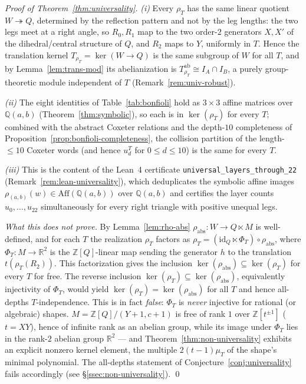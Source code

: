 \documentclass[11pt,a4paper]{article}
\theoremstyle{remark}
\theoremstyle{plain}
\begin{document}
\begin{proof}[Proof of Theorem~\ref{thm:universality}]
\emph{(i)}  Every $\rho_T$ has the same linear quotient
$W \twoheadrightarrow Q$, determined by the reflection pattern and not by
the leg lengths: the two legs meet at a right angle, so $R_0, R_1$ map to
the two order-$2$ generators $X, X'$ of the dihedral/central structure of
$Q$, and $R_2$ maps to $Y$, uniformly in $T$.  Hence the translation
kernel $T_{\rho_T} = \ker(W \to Q)$ is the same subgroup of $W$ for all
$T$, and by Lemma~\ref{lem:trans-mod} its abelianization is
$T_{\rho_T}^{\mathrm{ab}} \cong I_A \cap I_B$, a purely group-theoretic
module independent of $T$ (Remark~\ref{rem:univ-robust}).

\emph{(ii)}  The eight identities of Table~\ref{tab:bonfioli} hold as
$3 \times 3$ affine matrices over $\mathbb{Q}(a, b)$
(Theorem~\ref{thm:symbolic}), so each is in $\ker(\rho_T)$ for every $T$;
combined with the abstract Coxeter relations and the depth-$10$
completeness of Proposition~\ref{prop:bonfioli-completeness}, the
collision partition of the length-$\le 10$ Coxeter words (and hence
$u_d^T$ for $0 \le d \le 10$) is the same for every $T$.

\emph{(iii)}  This is the content of the Lean~4 certificate
\texttt{universal\_layers\_through\_22}
(Remark~\ref{rem:lean-universality}), which deduplicates the symbolic
affine images $\rho_{(a,b)}(w) \in \mathrm{Aff}(\mathbb{Q}(a,b))$ over
$\mathbb{Q}(a,b)$ and certifies the layer counts $u_0, \dots, u_{22}$
simultaneously for every right triangle with positive unequal legs.

\emph{What this does not prove.}  By Lemma~\ref{lem:rho-abs}
$\rho_{\mathrm{abs}} : W \to Q \ltimes M$ is well-defined, and for each
$T$ the realization $\rho_T$ factors as
$\rho_T = (\mathrm{id}_Q \ltimes \Phi_T) \circ \rho_{\mathrm{abs}}$,
where $\Phi_T : M \to \mathbb{R}^2$ is the $\mathbb{Z}[Q]$-linear map
sending the generator $h$ to the translation $t(\rho_T(R_2))$.  This
factorization gives the inclusion
$\ker(\rho_{\mathrm{abs}}) \subseteq \ker(\rho_T)$ for every $T$ for
free.  The reverse inclusion $\ker(\rho_T) \subseteq
\ker(\rho_{\mathrm{abs}})$, equivalently injectivity of $\Phi_T$,
would yield $\ker(\rho_T) = \ker(\rho_{\mathrm{abs}})$ for all $T$ and
hence all-depths $T$-independence.  This is in fact \emph{false}:
$\Phi_T$ is \emph{never} injective for rational (or algebraic) shapes.
$M = \mathbb{Z}[Q]/(Y+1, c+1)$ is free of rank $1$ over
$\mathbb{Z}[t^{\pm 1}]$ ($t = XY$), hence of infinite rank as an abelian
group, while its image under $\Phi_T$ lies in the rank-$2$ abelian group
$\mathbb{R}^2$ --- and Theorem~\ref{thm:non-universality} exhibits an
explicit nonzero kernel element, the multiple
$2(t-1)\mu_T$ of the shape's minimal polynomial.  The all-depths
statement of Conjecture~\ref{conj:universality} fails accordingly
(see \S\ref{ssec:non-universality}).
\qed
\end{proof}
\end{document}
